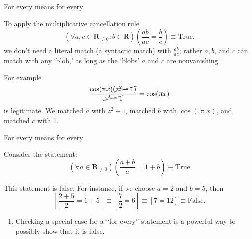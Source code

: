 \documentclass[portrait,fleqn,12pt]{beamer}
\newcommand{\reals}{\mathbf{R}}
\newenvironment{handlist}
   {\begin{enumerate}[\faHandPointRight]
       \addtolength{\itemsep}{0.0\itemsep}}
     {\end{enumerate}}
\begin{document}
\begin{frame}{For every means for every}

To apply the multiplicative cancellation rule
\begin{equation*} 
   \left(\forall a, c\in \reals_{\neq 0}, b \in \reals \right)\left(\frac{a b}{a c} = \frac{b}{c} \right) \equiv \text{True}.
  \end{equation*}
 we don't need a literal match (a syntactic match) with $\frac{a b}{a c}$; rather $a,b$, and $c$ can match with any `blob,'  as long as
 the `blobs'  $a$ and $c$ are nonvanishing.
 
For example
\begin{equation*}
   \frac{ \cos(\uppi x) \cancel{ (z^2 + 1)}}{ \cancel{z^2 + 1} } =  \cos(\uppi x)
\end{equation*}
is legitimate.  We matched $a$ with $z^2 + 1$,  matched $b$ with $ \cos(\uppi x) $, and matched $c$ with 1.


\end{frame}

\begin{frame}{For every means for every}

Consider the statement:
\begin{equation*}
  \left(\forall a \in \reals_{\neq 0} \right)\left(\frac{a+b}{a} = 1 + b \right) \equiv \text{True}
\end{equation*}

This statement is false. For instance, if we choose $a=2$ and $b=5$, then
\begin{equation*}
    \left[ \frac{2+5}{2} = 1+5 \right] \equiv   \left[ \frac{7}{2} = 6 \right]  \equiv \left[ 7 = 12\right]  \equiv \text{False}.
\end{equation*}

\begin{handlist}
\item Checking a special case for a ``for every''  statement is a powerful way to possibly show that it is false.
\end{handlist}

\end{frame}
\end{document}
